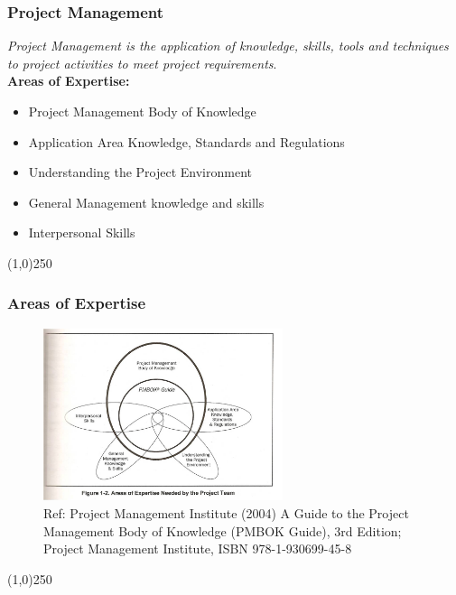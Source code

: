 \begin{frame}
\frametitle{Project Management}
\textit{Project Management is the application of knowledge, skills, tools and techniques to project activities to meet project requirements}.\\
\textbf{Areas of Expertise:}\\
\begin{itemize}
\item Project Management Body of Knowledge
\item Application Area Knowledge, Standards and Regulations
\item Understanding the Project Environment
\item General Management knowledge and skills
\item Interpersonal Skills
\end{itemize}
\end{frame}
\begin{center}\line(1,0){250}\end{center}



\begin{frame}
\frametitle{Areas of Expertise}

 \begin{figure}
 	\centering
 		\includegraphics[width = 7cm]{images/Fig1-2old.jpg}
	\caption{Ref: Project Management Institute (2004) A Guide to the Project Management Body of Knowledge (PMBOK Guide), 3rd Edition; Project Management Institute, ISBN 978-1-930699-45-8}
 	\label{fig:1-2old}
 \end{figure}
\end{frame}
\begin{center}\line(1,0){250}\end{center}



